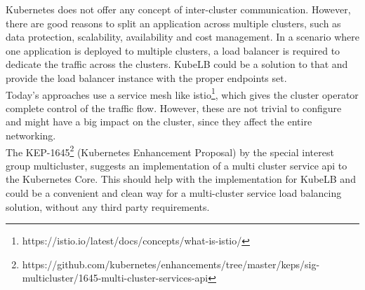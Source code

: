 Kubernetes does not offer any concept of inter-cluster communication.
However, there are good reasons to split an application across multiple clusters, such as data protection, scalability, availability and cost management.
In a scenario where one application is deployed to multiple clusters, a load balancer is required to dedicate the traffic across the clusters.
KubeLB could be a solution to that and provide the load balancer instance with the proper endpoints set.
\\
Today's approaches use a service mesh like istio\footnote{https://istio.io/latest/docs/concepts/what-is-istio/}, which gives the cluster operator complete control of the traffic flow.
However, these are not trivial to configure and might have a big impact on the cluster, since they affect the entire networking.
\\
The KEP-1645\footnote{https://github.com/kubernetes/enhancements/tree/master/keps/sig-multicluster/1645-multi-cluster-services-api} (Kubernetes Enhancement Proposal) by the special interest group multicluster, suggests an implementation of a multi cluster service api to the Kubernetes Core.
This should help with the implementation for KubeLB and could be a convenient and clean way for a multi-cluster service load balancing solution, without any third party requirements.
